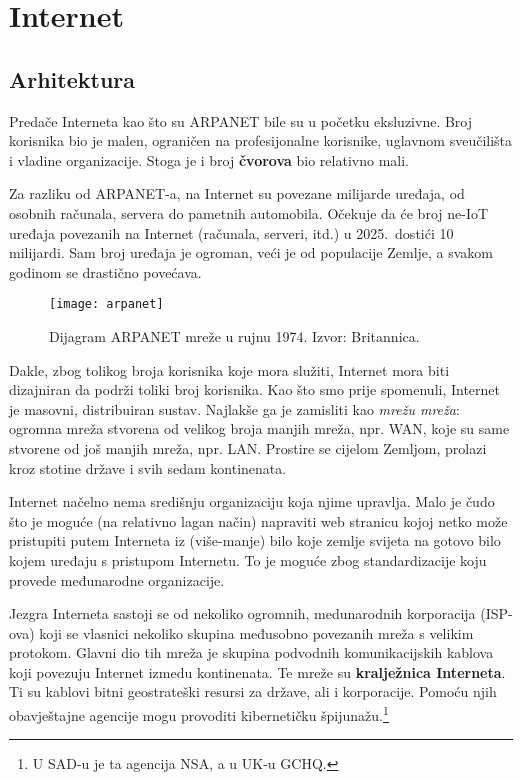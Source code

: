 
\section[Internet]{Internet}

\subsection{Arhitektura}

Predače Interneta kao što su ARPANET bile su u početku eksluzivne.
Broj korisnika bio je malen, ograničen na profesijonalne korisnike, uglavnom sveučilišta i vladine organizacije.
Stoga je i broj \textbf{čvorova} bio relativno mali.

Za razliku od ARPANET-a, na Internet su povezane milijarde uređaja, od osobnih računala, servera do pametnih automobila.
Očekuje da će broj ne-IoT uređaja povezanih na Internet (računala, serveri, itd.) u 2025.\ dostići 10 milijardi.
Sam broj uređaja je ogroman, veći je od populacije Zemlje, a svakom godinom se drastično povećava.


\begin{figure}[h]\label{fig:arpanet}
\texttt{[image: arpanet]}
\raggedleft
\caption{Dijagram ARPANET mreže u rujnu 1974. Izvor: Britannica.}
\end{figure}

Dakle, zbog tolikog broja korisnika koje mora služiti, Internet mora biti dizajniran da podrži toliki broj korisnika.
Kao što smo prije spomenuli, Internet je masovni, distribuiran sustav.
Najlakše ga je zamisliti kao \textit{mrežu mreža}: ogromna mreža stvorena od velikog broja manjih mreža, npr. WAN, koje su same stvorene od još manjih mreža, npr. LAN.
Prostire se cijelom Zemljom, prolazi kroz stotine države i svih sedam kontinenata.

Internet načelno nema središnju organizaciju koja njime upravlja.
Malo je čudo što je moguće (na relativno lagan način) napraviti web stranicu kojoj netko može pristupiti putem Interneta iz (više-manje) bilo koje zemlje svijeta na gotovo bilo kojem uređaju s pristupom Internetu.
To je moguće zbog standardizacije koju provede međunarodne organizacije.

Jezgra Interneta sastoji se od nekoliko ogromnih, medunarodnih korporacija (ISP-ova) koji se vlasnici nekoliko skupina međusobno povezanih  mreža s velikim protokom.
Glavni dio tih mreža je skupina podvodnih komunikacijskih kablova koji povezuju Internet izmedu kontinenata.
Te mreže su \textbf{kralježnica Interneta}.
Ti su kablovi bitni geostrateški resursi za države, ali i korporacije.
Pomoću njih obavještajne agencije mogu provoditi kibernetičku špijunažu.\footnote{U SAD-u je ta agencija NSA, a u UK-u GCHQ.}

